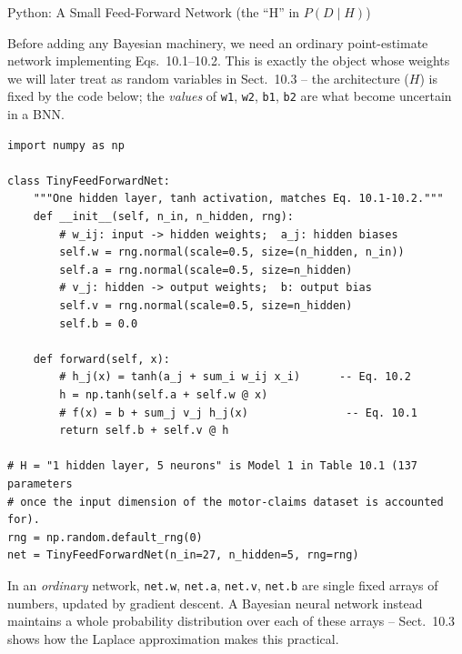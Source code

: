 \documentclass[aspectratio=169,10pt]{beamer}
\begin{document}
\begin{frame}[fragile]{Python: A Small Feed-Forward Network (the ``H'' in $P(D\mid H)$)}

Before adding any Bayesian machinery, we need an ordinary point-estimate
network implementing Eqs.\ 10.1--10.2. This is exactly the object whose
weights we will later treat as random variables in Sect.\ 10.3 -- the
architecture ($H$) is fixed by the code below; the \emph{values} of
\texttt{w1}, \texttt{w2}, \texttt{b1}, \texttt{b2} are what become uncertain
in a BNN.

\begin{lstlisting}[caption={A tiny feed-forward net, matching Eqs. 10.1--10.2}]
import numpy as np

class TinyFeedForwardNet:
    """One hidden layer, tanh activation, matches Eq. 10.1-10.2."""
    def __init__(self, n_in, n_hidden, rng):
        # w_ij: input -> hidden weights;  a_j: hidden biases
        self.w = rng.normal(scale=0.5, size=(n_hidden, n_in))
        self.a = rng.normal(scale=0.5, size=n_hidden)
        # v_j: hidden -> output weights;  b: output bias
        self.v = rng.normal(scale=0.5, size=n_hidden)
        self.b = 0.0

    def forward(self, x):
        # h_j(x) = tanh(a_j + sum_i w_ij x_i)      -- Eq. 10.2
        h = np.tanh(self.a + self.w @ x)
        # f(x) = b + sum_j v_j h_j(x)               -- Eq. 10.1
        return self.b + self.v @ h

# H = "1 hidden layer, 5 neurons" is Model 1 in Table 10.1 (137 parameters
# once the input dimension of the motor-claims dataset is accounted for).
rng = np.random.default_rng(0)
net = TinyFeedForwardNet(n_in=27, n_hidden=5, rng=rng)
\end{lstlisting}

In an \emph{ordinary} network, \texttt{net.w}, \texttt{net.a}, \texttt{net.v},
\texttt{net.b} are single fixed arrays of numbers, updated by gradient
descent. A Bayesian neural network instead maintains a whole probability
distribution over each of these arrays -- Sect.\ 10.3 shows how the Laplace
approximation makes this practical.

\end{frame}
\end{document}
